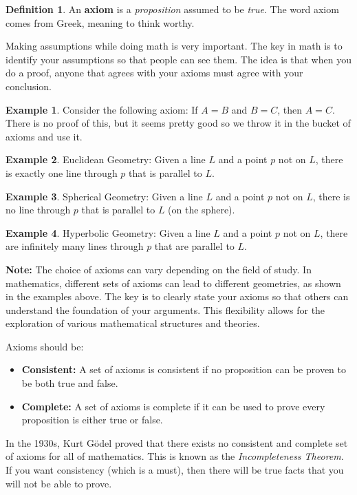 \documentclass[11pt]{article}
\theoremstyle{definition}
\newtheorem{definition}{Definition}
\newtheorem{example}{Example}
\begin{document}
\begin{definition}
  An \textbf{axiom} is a \textit{proposition} assumed to be \textit{true}. The word axiom comes from Greek, meaning to think worthy.
\end{definition}

Making assumptions while doing math is very important. The key in math is to identify your assumptions so that people can see them. The idea is that when you do a proof, anyone that agrees with your axioms must agree with your conclusion.

\begin{example}
  Consider the following axiom: If \( A = B \) and \( B = C \), then \( A = C \). There is no proof of this, but it seems pretty good so we throw it in the bucket of axioms and use it.
\end{example}

\begin{example}
  Euclidean Geometry: Given a line \( L \) and a point \( p \) not on \( L \), there is exactly one line through \( p \) that is parallel to \( L \).
\end{example}

\begin{example}
  Spherical Geometry: Given a line \( L \) and a point \( p \) not on \( L \), there is no line through \( p \) that is parallel to \( L \) (on the sphere).
\end{example}

\begin{example}
  Hyperbolic Geometry: Given a line \( L \) and a point \( p \) not on \( L \), there are infinitely many lines through \( p \) that are parallel to \( L \).
\end{example}

\textbf{Note:} The choice of axioms can vary depending on the field of study. In mathematics, different sets of axioms can lead to different geometries, as shown in the examples above. The key is to clearly state your axioms so that others can understand the foundation of your arguments. This flexibility allows for the exploration of various mathematical structures and theories.

Axioms should be:
\begin{itemize}
  \item \textbf{Consistent:} A set of axioms is consistent if no proposition can be proven to be both true and false.
  \item \textbf{Complete:} A set of axioms is complete if it can be used to prove every proposition is either true or false.
\end{itemize}

In the 1930s, Kurt Gödel proved that there exists no consistent and complete set of axioms for all of mathematics. This is known as the \textit{Incompleteness Theorem}. If you want consistency (which is a must), then there will be true facts that you will not be able to prove.
\end{document}
